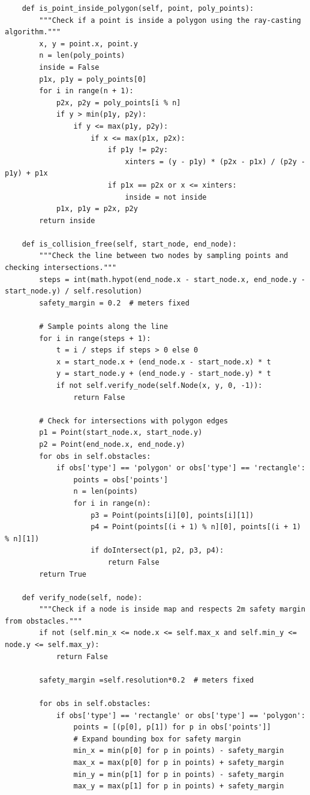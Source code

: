 \begin{lstlisting}
    def is_point_inside_polygon(self, point, poly_points):
        """Check if a point is inside a polygon using the ray-casting algorithm."""
        x, y = point.x, point.y
        n = len(poly_points)
        inside = False
        p1x, p1y = poly_points[0]
        for i in range(n + 1):
            p2x, p2y = poly_points[i % n]
            if y > min(p1y, p2y):
                if y <= max(p1y, p2y):
                    if x <= max(p1x, p2x):
                        if p1y != p2y:
                            xinters = (y - p1y) * (p2x - p1x) / (p2y - p1y) + p1x
                        if p1x == p2x or x <= xinters:
                            inside = not inside
            p1x, p1y = p2x, p2y
        return inside

    def is_collision_free(self, start_node, end_node):
        """Check the line between two nodes by sampling points and checking intersections."""
        steps = int(math.hypot(end_node.x - start_node.x, end_node.y - start_node.y) / self.resolution)
        safety_margin = 0.2  # meters fixed

        # Sample points along the line
        for i in range(steps + 1):
            t = i / steps if steps > 0 else 0
            x = start_node.x + (end_node.x - start_node.x) * t
            y = start_node.y + (end_node.y - start_node.y) * t
            if not self.verify_node(self.Node(x, y, 0, -1)):
                return False

        # Check for intersections with polygon edges
        p1 = Point(start_node.x, start_node.y)
        p2 = Point(end_node.x, end_node.y)
        for obs in self.obstacles:
            if obs['type'] == 'polygon' or obs['type'] == 'rectangle':
                points = obs['points']
                n = len(points)
                for i in range(n):
                    p3 = Point(points[i][0], points[i][1])
                    p4 = Point(points[(i + 1) % n][0], points[(i + 1) % n][1])
                    if doIntersect(p1, p2, p3, p4):
                        return False
        return True

    def verify_node(self, node):
        """Check if a node is inside map and respects 2m safety margin from obstacles."""
        if not (self.min_x <= node.x <= self.max_x and self.min_y <= node.y <= self.max_y):
            return False

        safety_margin =self.resolution*0.2  # meters fixed
        
        for obs in self.obstacles:
            if obs['type'] == 'rectangle' or obs['type'] == 'polygon':
                points = [(p[0], p[1]) for p in obs['points']]
                # Expand bounding box for safety margin
                min_x = min(p[0] for p in points) - safety_margin
                max_x = max(p[0] for p in points) + safety_margin
                min_y = min(p[1] for p in points) - safety_margin
                max_y = max(p[1] for p in points) + safety_margin
                

\end{lstlisting}
